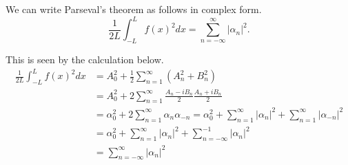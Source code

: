 We can write Parseval's theorem as follows in complex form.
$$
\frac{1}{2 L} \int_{-L}^L f(x)^2 d x=\sum_{n=-\infty}^{\infty}\left|\alpha_n\right|^2 .
$$

This is seen by the calculation below.
$$
\begin{aligned}
\frac{1}{2 L} \int_{-L}^L f(x)^2 d x & =A_0^2+\frac{1}{2} \sum_{n=1}^{\infty}\left(A_n^2+B_n^2\right) \\
& =A_0^2+2 \sum_{n=1}^{\infty} \frac{A_n-i B_n}{2} \frac{A_n+i B_n}{2} \\
& =\alpha_0^2+2 \sum_{n=1}^{\infty} \alpha_n \alpha_{-n}=\alpha_0^2+\sum_{n=1}^{\infty}\left|\alpha_n\right|^2+\sum_{n=1}^{\infty}\left|\alpha_{-n}\right|^2 \\
& =\alpha_0^2+\sum_{n=1}^{\infty}\left|\alpha_n\right|^2+\sum_{n=-\infty}^{-1}\left|\alpha_n\right|^2 \\
& =\sum_{n=-\infty}^{\infty}\left|\alpha_n\right|^2
\end{aligned}
$$

